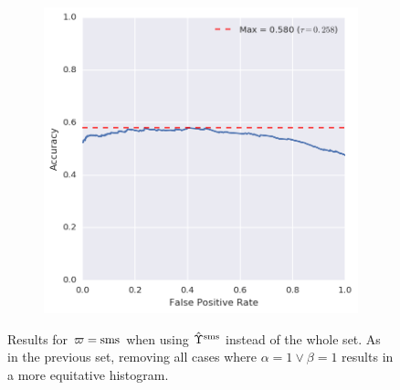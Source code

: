 \begin{figure}[p]
\begin{subfigure}[b]{.49\textwidth}
	\includegraphics[height=.20\textheight]{figures/bayes/least1/accuracy_sms.png}
\end{subfigure}
\caption{Results for $\varpi = \operatorname{sms}$ when using $\hat{\Upsilon}^{\operatorname{sms}}$ instead of the whole set. As in the previous set, removing all cases where $\alpha = 1 \lor \beta = 1$ results in a more equitative histogram.}
\end{figure}


